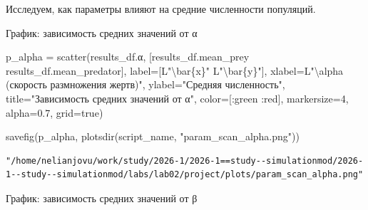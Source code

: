 \documentclass[
  12pt,
  a4paper,
  DIV=11,
  numbers=noendperiod]{scrreprt}
\newenvironment{Shaded}{\begin{snugshade}}{\end{snugshade}}
\newcommand{\ConstantTok}[1]{\textcolor[rgb]{0.56,0.35,0.01}{#1}}
\newcommand{\FloatTok}[1]{\textcolor[rgb]{0.68,0.00,0.00}{#1}}
\newcommand{\FunctionTok}[1]{\textcolor[rgb]{0.28,0.35,0.67}{#1}}
\newcommand{\NormalTok}[1]{\textcolor[rgb]{0.00,0.23,0.31}{#1}}
\newcommand{\OperatorTok}[1]{\textcolor[rgb]{0.37,0.37,0.37}{#1}}
\newcommand{\SpecialCharTok}[1]{\textcolor[rgb]{0.37,0.37,0.37}{#1}}
\newcommand{\StringTok}[1]{\textcolor[rgb]{0.13,0.47,0.30}{#1}}
\begin{document}
Исследуем, как параметры влияют на средние численности популяций.

График: зависимость средних значений от α

\begin{Shaded}
\begin{Highlighting}[]
\NormalTok{p\_alpha }\OperatorTok{=} \FunctionTok{scatter}\NormalTok{(results\_df.α, [results\_df.mean\_prey results\_df.mean\_predator],}
\NormalTok{    label}\OperatorTok{=}\NormalTok{[L}\StringTok{"}\SpecialCharTok{\textbackslash{}b}\StringTok{ar\{x\}"}\NormalTok{ L}\StringTok{"}\SpecialCharTok{\textbackslash{}b}\StringTok{ar\{y\}"}\NormalTok{],}
\NormalTok{    xlabel}\OperatorTok{=}\NormalTok{L}\StringTok{"}\SpecialCharTok{\textbackslash{}a}\StringTok{lpha (скорость размножения жертв)"}\NormalTok{,}
\NormalTok{    ylabel}\OperatorTok{=}\StringTok{"Средняя численность"}\NormalTok{,}
\NormalTok{    title}\OperatorTok{=}\StringTok{"Зависимость средних значений от α"}\NormalTok{,}
\NormalTok{    color}\OperatorTok{=}\NormalTok{[}\OperatorTok{:}\NormalTok{green }\OperatorTok{:}\NormalTok{red],}
\NormalTok{    markersize}\OperatorTok{=}\FloatTok{4}\NormalTok{,}
\NormalTok{    alpha}\OperatorTok{=}\FloatTok{0.7}\NormalTok{,}
\NormalTok{    grid}\OperatorTok{=}\ConstantTok{true}\NormalTok{)}

\FunctionTok{savefig}\NormalTok{(p\_alpha, }\FunctionTok{plotsdir}\NormalTok{(script\_name, }\StringTok{"param\_scan\_alpha.png"}\NormalTok{))}
\end{Highlighting}
\end{Shaded}

\begin{verbatim}
"/home/nelianjovu/work/study/2026-1/2026-1==study--simulationmod/2026-1--study--simulationmod/labs/lab02/project/plots/param_scan_alpha.png"
\end{verbatim}

График: зависимость средних значений от β
\end{document}
